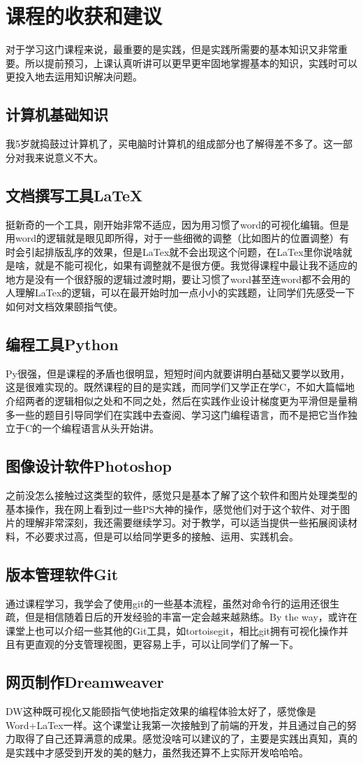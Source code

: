 \documentclass[supercite]{Experimental_Report}
\theoremstyle{definition}
\begin{document}
\section{课程的收获和建议}

对于学习这门课程来说，最重要的是实践，但是实践所需要的基本知识又非常重要。所以提前预习，上课认真听讲可以更早更牢固地掌握基本的知识，实践时可以更投入地去运用知识解决问题。

\subsection{计算机基础知识}

我5岁就捣鼓过计算机了，买电脑时计算机的组成部分也了解得差不多了。这一部分对我来说意义不大。

\subsection{文档撰写工具LaTeX}
挺新奇的一个工具，刚开始非常不适应，因为用习惯了word的可视化编辑。但是用word的逻辑就是眼见即所得，对于一些细微的调整（比如图片的位置调整）有时会引起排版乱序的效果，但是LaTex就不会出现这个问题，在LaTex里你说啥就是啥，就是不能可视化，如果有调整就不是很方便。我觉得课程中最让我不适应的地方是没有一个很舒服的逻辑过渡时期，要让习惯了word甚至连word都不会用的人理解LaTex的逻辑，可以在最开始时加一点小小的实践题，让同学们先感受一下如何对文档效果颐指气使。
\subsection{编程工具Python}
Py很强，但是课程的矛盾也很明显，短短时间内就要讲明白基础又要学以致用，这是很难实现的。既然课程的目的是实践，而同学们又学正在学C，不如大篇幅地介绍两者的逻辑相似之处和不同之处，然后在实践作业设计梯度更为平滑但是量稍多一些的题目引导同学们在实践中去查阅、学习这门编程语言，而不是把它当作独立于C的一个编程语言从头开始讲。
\subsection{图像设计软件Photoshop}
之前没怎么接触过这类型的软件，感觉只是基本了解了这个软件和图片处理类型的基本操作，我在网上看到过一些PS大神的操作，感觉他们对于这个软件、对于图片的理解非常深刻，我还需要继续学习。对于教学，可以适当提供一些拓展阅读材料，不必要求过高，但是可以给同学更多的接触、运用、实践机会。
\subsection{版本管理软件Git}
通过课程学习，我学会了使用git的一些基本流程，虽然对命令行的运用还很生疏，但是相信随着日后的开发经验的丰富一定会越来越熟练。By the way，或许在课堂上也可以介绍一些其他的Git工具，如tortoisegit，相比git拥有可视化操作并且有更直观的分支管理视图，更容易上手，可以让同学们了解一下。
\subsection{网页制作Dreamweaver}
DW这种既可视化又能颐指气使地指定效果的编程体验太好了，感觉像是Word+LaTex一样。这个课堂让我第一次接触到了前端的开发，并且通过自己的努力取得了自己还算满意的成果。感觉没啥可以建议的了，主要是实践出真知，真的是实践中才感受到开发的美的魅力，虽然我还算不上实际开发哈哈哈。
\end{document}
